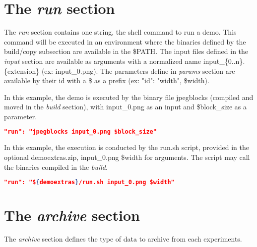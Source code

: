 \section{The \emph{run} section}

The \emph{run} section contains one string, the shell command to run a demo.
This command will be executed in an environment where the
binaries defined by the build/copy subsection are available in the \$PATH.
The input files defined in the \emph{input} section are available as arguments
with a normalized name input\_\{0..n\}.\{extension\} (ex: input\_0.png). 
The parameters define in \emph{params} section are available by their id with a 
\$ as a prefix (ex: "id": "width", \$width).


In this example, the demo is executed by the binary file jpegblocks
(compiled and moved in the \emph{build} section), 
with input\_0.png as an input and \$block\_size as a parameter.
\begin{lstlisting}[language=json,firstnumber=1]
  "run": "jpegblocks input_0.png $block_size"\end{lstlisting}


In this example, the execution is conducted by the run.sh script, provided in the
optional demoextras.zip, input\_0.png \$width for arguments. The script may call the binaries compiled in the \emph{build}.
\begin{lstlisting}[language=json,firstnumber=1]
  "run": "${demoextras}/run.sh input_0.png $width"\end{lstlisting}


\section{The \emph{archive} section}

The \emph{archive} section defines the type of data to archive from each experiments.

